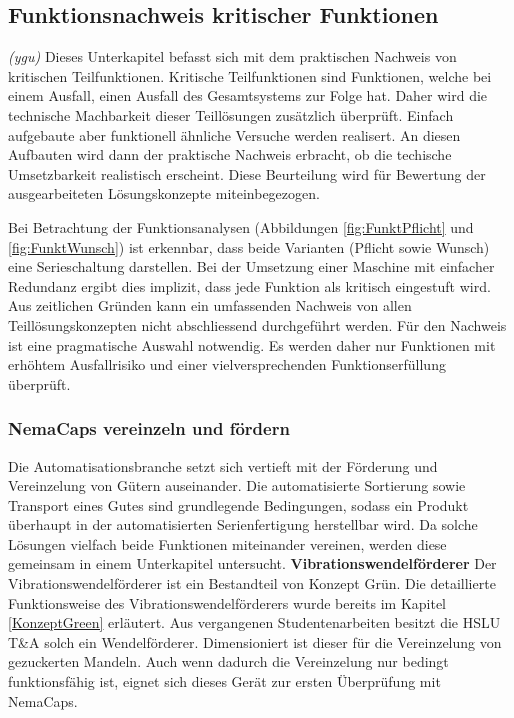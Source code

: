 \subsection{Funktionsnachweis kritischer Funktionen}
\label{funktionsnachweis}
\textit{(ygu)} Dieses Unterkapitel befasst sich mit dem praktischen Nachweis von kritischen Teilfunktionen. Kritische Teilfunktionen sind Funktionen, welche bei einem Ausfall, einen Ausfall des Gesamtsystems zur Folge hat. Daher wird die technische Machbarkeit dieser Teillösungen zusätzlich überprüft. Einfach aufgebaute aber funktionell ähnliche Versuche werden realisert. An diesen Aufbauten wird dann der praktische Nachweis erbracht, ob die techische Umsetzbarkeit realistisch erscheint. Diese Beurteilung wird für Bewertung der ausgearbeiteten Lösungskonzepte miteinbegezogen.
\newline

Bei Betrachtung der Funktionsanalysen (Abbildungen \ref{fig:FunktPflicht} und \ref{fig:FunktWunsch}) ist erkennbar, dass beide Varianten (Pflicht sowie Wunsch) eine Serieschaltung darstellen.  Bei der Umsetzung einer Maschine mit einfacher Redundanz ergibt dies implizit, dass jede Funktion als kritisch eingestuft wird. Aus zeitlichen Gründen kann ein umfassenden Nachweis von allen Teillösungskonzepten nicht abschliessend durchgeführt werden. Für den Nachweis ist eine pragmatische Auswahl notwendig. Es werden daher nur Funktionen mit erhöhtem Ausfallrisiko und einer vielversprechenden Funktionserfüllung überprüft.

\subsubsection{NemaCaps vereinzeln und fördern}
Die Automatisationsbranche setzt sich vertieft mit der Förderung und Vereinzelung von Gütern auseinander. Die automatisierte Sortierung sowie Transport eines Gutes sind grundlegende Bedingungen, sodass ein Produkt überhaupt in der automatisierten Serienfertigung herstellbar wird. Da solche Lösungen vielfach beide Funktionen miteinander vereinen, werden diese gemeinsam in einem Unterkapitel untersucht.
\newline
\newline
\textbf{Vibrationswendelförderer}
\newline
Der Vibrationswendelförderer ist ein Bestandteil von Konzept Grün. Die detaillierte Funktionsweise des Vibrationswendelförderers wurde bereits im Kapitel \ref{KonzeptGreen} erläutert.
\newline
Aus vergangenen Studentenarbeiten besitzt die HSLU T\&A solch ein Wendelförderer. Dimensioniert ist dieser für die Vereinzelung von gezuckerten Mandeln. Auch wenn dadurch die Vereinzelung nur bedingt funktionsfähig ist, eignet sich dieses Gerät zur ersten Überprüfung mit NemaCaps. 

